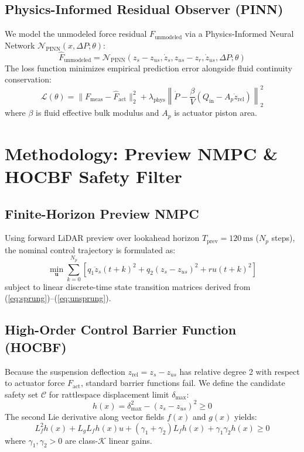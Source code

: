 \documentclass[journal,twocolumn,letterpaper]{IEEEtran}
\begin{document}
\subsection{Physics-Informed Residual Observer (PINN)}
We model the unmodeled force residual $F_{\text{unmodeled}}$ via a Physics-Informed Neural Network $\mathcal{N}_{\text{PINN}}(x, \Delta P; \theta)$:
\begin{equation}
\hat{F}_{\text{unmodeled}} = \mathcal{N}_{\text{PINN}}\left(z_s - z_{us}, \dot{z}_s, z_{us} - z_r, \dot{z}_{us}, \Delta P; \theta\right)
\end{equation}
The loss function minimizes empirical prediction error alongside fluid continuity conservation:
\begin{equation}
\mathcal{L}(\theta) = \|F_{\text{meas}} - \hat{F}_{\text{act}}\|_2^2 + \lambda_{\text{phys}} \left\| \dot{P} - \frac{\beta}{V}\left(Q_{\text{in}} - A_p \dot{z}_{\text{rel}}\right) \right\|_2^2
\end{equation}
where $\beta$ is fluid effective bulk modulus and $A_p$ is actuator piston area.

\section{Methodology: Preview NMPC \& HOCBF Safety Filter}

\subsection{Finite-Horizon Preview NMPC}
Using forward LiDAR preview over lookahead horizon $T_{\text{prev}} = 120\,\text{ms}$ ($N_p$ steps), the nominal control trajectory is formulated as:
\begin{equation}
\min_{\mathbf{u}} \sum_{k=0}^{N_p} \left[ q_1 \ddot{z}_s(t+k)^2 + q_2 (z_s - z_{us})^2 + r u(t+k)^2 \right]
\end{equation}
subject to linear discrete-time state transition matrices derived from (\ref{eq:sprung})--(\ref{eq:unsprung}).

\subsection{High-Order Control Barrier Function (HOCBF)}
Because the suspension deflection $z_{\text{rel}} = z_s - z_{us}$ has relative degree 2 with respect to actuator force $F_{\text{act}}$, standard barrier functions fail. We define the candidate safety set $\mathcal{C}$ for rattlespace displacement limit $\delta_{\max}$:
\begin{equation}
h(x) = \delta_{\max}^2 - (z_s - z_{us})^2 \ge 0
\end{equation}
The second Lie derivative along vector fields $f(x)$ and $g(x)$ yields:
\begin{equation}
L_f^2 h(x) + L_g L_f h(x) u + (\gamma_1 + \gamma_2) L_f h(x) + \gamma_1 \gamma_2 h(x) \ge 0
\end{equation}
where $\gamma_1, \gamma_2 > 0$ are class-$\mathcal{K}$ linear gains.
\end{document}
